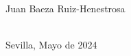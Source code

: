 \begin{titlepage}
\begin{minipage}{14cm}
\HRule \\[4cm]


{\Large

Juan Baeza Ruiz-Henestrosa} \\[0.5cm]

{\large
Sevilla, Mayo de 2024
}

\end{minipage}

\vfill %

\cleardoublepage
\thispagestyle{empty}
\end{titlepage}

\raggedbottom

